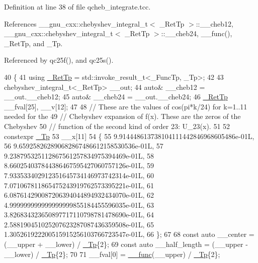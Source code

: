 Definition at line 38 of file qcheb\+\_\+integrate.\+tcc.



References \+\_\+\+\_\+gnu\+\_\+cxx\+::chebyshev\+\_\+integral\+\_\+t$<$ \+\_\+\+Ret\+Tp $>$\+::\+\_\+\+\_\+cheb12, \+\_\+\+\_\+gnu\+\_\+cxx\+::chebyshev\+\_\+integral\+\_\+t$<$ \+\_\+\+Ret\+Tp $>$\+::\+\_\+\+\_\+cheb24, \+\_\+\+\_\+func(), \+\_\+\+Ret\+Tp, and \+\_\+\+Tp.



Referenced by qc25f(), and qc25s().


\begin{DoxyCode}
40     \{
41       \textcolor{keyword}{using} \hyperlink{namespace____gnu__cxx_a886e03ece3d53ff7fa6c098a40f93fa5}{\_RetTp} = std::invoke\_result\_t<\_FuncTp, \_Tp>;
42 
43       chebyshev\_integral\_t<\_RetTp> \_\_out;
44       \textcolor{keyword}{auto}& \_\_cheb12 = \_\_out.\_\_cheb12;
45       \textcolor{keyword}{auto}& \_\_cheb24 = \_\_out.\_\_cheb24;
46       \hyperlink{namespace____gnu__cxx_a886e03ece3d53ff7fa6c098a40f93fa5}{\_RetTp} \_\_fval[25], \_\_v[12];
47 
48       \textcolor{comment}{// These are the values of cos(pi*k/24) for k=1..11 needed for the}
49       \textcolor{comment}{// Chebyshev expansion of f(x).  These are the zeros of the Chebyshev}
50       \textcolor{comment}{// function of the second kind of order 23: U\_23(x).}
51 
52       constexpr \hyperlink{namespace____gnu__cxx_a3b19a9c800ca194374ef9172290f7d79}{\_Tp}
53       \_\_x[11]
54       \{
55         9.914448613738104111442846968605486e-01L,
56         9.659258262890682867486612158530536e-01L,
57         9.238795325112867561257834975394469e-01L,
58         8.660254037844386467595427060757126e-01L,
59         7.933533402912351645734146973742314e-01L,
60         7.071067811865475243919762573395221e-01L,
61         6.087614290087206394044894932434070e-01L,
62         4.999999999999999999855184455596035e-01L,
63         3.826834323650897717110798781478690e-01L,
64         2.588190451025207623287087436359508e-01L,
65         1.305261922200515915256103766723547e-01L,
66       \};
67 
68       \textcolor{keyword}{const} \textcolor{keyword}{auto} \_\_center = (\_\_upper + \_\_lower) / \hyperlink{namespace____gnu__cxx_a3b19a9c800ca194374ef9172290f7d79}{\_Tp}\{2\};
69       \textcolor{keyword}{const} \textcolor{keyword}{auto} \_\_half\_length = (\_\_upper - \_\_lower) / \hyperlink{namespace____gnu__cxx_a3b19a9c800ca194374ef9172290f7d79}{\_Tp}\{2\};
70 
71       \_\_fval[0] = \hyperlink{namespace____gnu__cxx_af2b2f0c7a2ae72b922b1afefae5a65b2}{\_\_func}(\_\_upper) / \hyperlink{namespace____gnu__cxx_a3b19a9c800ca194374ef9172290f7d79}{\_Tp}\{2\};

\end{DoxyCode}
